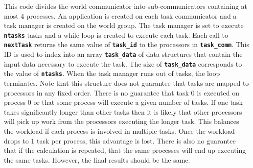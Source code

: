 This code divides the world communicator into sub-communicators containing at
most 4 processes. An application is created on each task communicator and a task
manager is created on the world group. The task manager is set to execute
\texttt{\textbf{ntasks}} tasks and a while loop is created to execute each task.
Each call to \texttt{\textbf{nextTask}} returns the same value of
\texttt{\textbf{task\_id}} to the processors in \texttt{\textbf{task\_comm}}.
This ID is used to index into an array \texttt{\textbf{task\_data}} of data
structures that contain the input data necessary to execute the task. The size
of \texttt{\textbf{task\_data}} corresponds to the value of
\texttt{\textbf{ntasks}}. When the task manager runs out of tasks, the loop
terminates. Note that this structure does not guarantee that tasks are mapped to
processors in any fixed order. There is no guarantee that task 0 is executed on
process 0 or that some process will execute a given number of tasks. If one task
takes significantly longer than other tasks then it is likely that other
processors will pick up work from the processors executing the longer task. This
balances the workload if each process is involved in multiple tasks. Once the
workload drops to 1 task per process, this advantage is lost. There is also no
guarantee that if the calculation is repeated, that the same processes will end
up executing the same tasks. However, the final results should be the same.
\newline
\hyperlink{topDoc}{\color{blue}{Top}}

